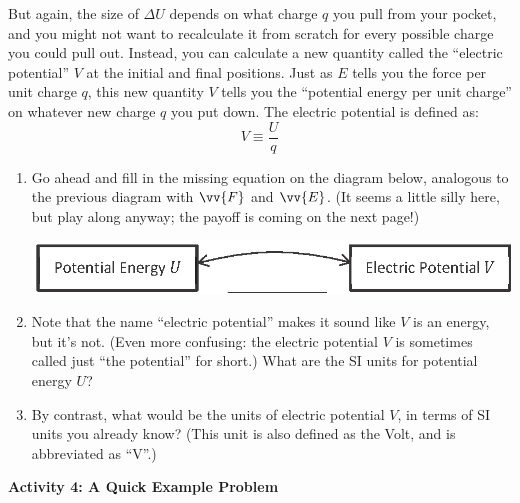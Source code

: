 But again, the size of $\Delta U$ depends on what charge $q$ you pull from your pocket, and you might not want to recalculate it from scratch for every possible charge you could pull out.  Instead, you can calculate a new quantity called the ``electric potential'' $V$ at the initial and final positions.  Just as $E$ tells you the force per unit charge $q$, this new quantity $V$ tells you the ``potential energy per unit charge'' on whatever new charge $q$ you put down.  The electric potential is defined as:
$$V \equiv \frac{U}{q}$$
\vspace{-0.3 in}
\begin{enumerate}[wide, label=(\emph{\alph*})]

\item Go ahead and fill in the missing equation on the diagram below, analogous to the previous diagram with $\vv{F}$ and $\vv{E}$.  (It seems a little silly here, but play along anyway; the payoff is coming on the next page!)
\begin{center}
\includegraphics{potential_intro/concept_map_figs/concept_map_U_and_V_blank.eps}
\end{center}

\item Note that the name ``electric potential'' makes it sound like $V$ is an energy, but it's not.  (Even more confusing: the electric potential $V$ is sometimes called just ``the potential'' for short.)  What are the SI units for potential energy $U$?  
\answerspace{0.3in}

\item By contrast, what would be the units of electric potential $V$, in terms of SI units you already know?  (This unit is also defined as the Volt, and is abbreviated as ``V''.)
\answerspace{0.3in}

\end{enumerate}

\pagebreak[2]
\textbf{Activity 4: A Quick Example Problem}

